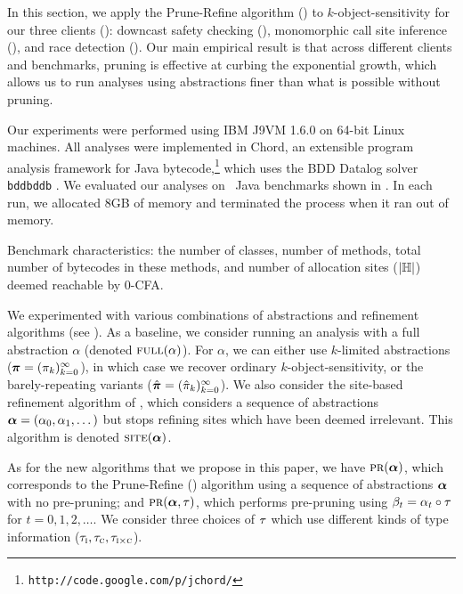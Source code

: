 
In this section, we apply the Prune-Refine algorithm () to
$k$-object-sensitivity for our three clients ():
downcast safety checking (\downcast),
monomorphic call site inference (\monosite),
and race detection (\race).
Our main empirical result is that across different clients and benchmarks,
pruning is effective at curbing the exponential growth,
which allows us to run analyses using abstractions finer than what is possible without pruning.


Our experiments were performed using IBM J9VM 1.6.0 on 64-bit Linux machines.
All analyses were implemented in Chord,
an extensible program analysis framework for Java bytecode,\footnote{{\tt{http://code.google.com/p/jchord/}}}
which uses the BDD Datalog solver {\tt bddbddb} \cite{Whaley2007}.
We evaluated our analyses on \numBenchmarks\ Java benchmarks shown in .
In each run, we allocated 8GB of memory and terminated the process when it ran out of memory.

\begin{table*}
\centering

\caption{Benchmark characteristics:
the number of classes,
number of methods,
total number of bytecodes in these methods,
and number of allocation sites ($|{\mathbb H}|$)
deemed reachable by 0-CFA.
\label{tab:benchmarks}}
\end{table*}

We experimented with various combinations of abstractions and refinement
algorithms (see ).  As a baseline, we consider running an analysis
with a full abstraction $\alpha$ (denoted $\text{\sc full}(\alpha)$).
For $\alpha$, we can either use $k$-limited abstractions
($\mbox{\boldmath$\pi$} = (\pi_k)_{k=0}^\infty$), in which case we recover ordinary $k$-object-sensitivity,
or the barely-repeating variants ($\hat{\mbox{\boldmath$\pi$}} = (\hat{\pi}_k)_{k=0}^\infty$).
We also consider the site-based refinement algorithm of \cite{liang11minimal},
which considers a sequence of abstractions $\mbox{\boldmath$\alpha$} = (\alpha_0, \alpha_1, \dots)$
but stops refining sites which have been deemed irrelevant.  This algorithm is denoted $\text{\sc site}(\mbox{\boldmath$\alpha$})$.

As for the new algorithms that we propose in this paper,
we have $\text{\sc pr}(\mbox{\boldmath$\alpha$})$, which corresponds to the Prune-Refine (\PR) algorithm using a sequence of abstractions $\mbox{\boldmath$\alpha$}$ with no pre-pruning;
and $\text{\sc pr}(\mbox{\boldmath$\alpha$},\tau)$, which performs pre-pruning using $\beta_t = \alpha_t
\circ \tau$ for $t = 0, 1, 2, \dots$.  We consider three choices of $\tau$
which use different kinds of type information ($\tau_{\text{\sc i}},\tau_{\text{\sc c}},\tau_{\text{\sc i} \times \text{\sc c}}$).

